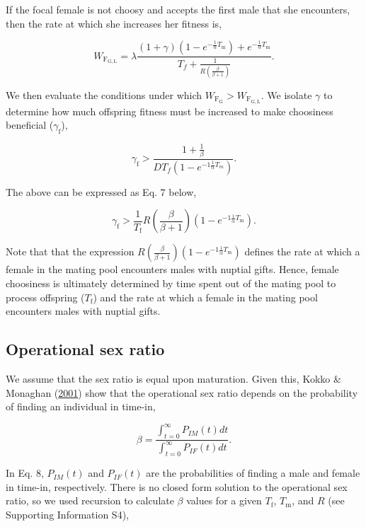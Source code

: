 \documentclass[
]{article}
\begin{document}
If the focal female is not choosy and accepts the first male that she
encounters, then the rate at which she increases her fitness is,

\[W_{\mathrm{F_{G,L}}} = \lambda \frac{\left(1 + \gamma\right)\left(1 - e^{-\frac{1}{\alpha}T_{\mathrm{m}}}\right) + e^{-\frac{1}{\alpha}T_{\mathrm{m}}}}{T_{f} + \frac{1}{R \left(\frac{\beta}{\beta + 1}\right)}}.\]

We then evaluate the conditions under which
\(W_{\mathrm{F_{G}}} > W_{\mathrm{F_{G,L}}}\). We isolate \(\gamma\) to
determine how much offspring fitness must be increased to make
choosiness beneficial (\(\gamma_{\mathrm{f}}\)),

\[\gamma_{\mathrm{f}} > \frac{1 + \frac{1}{\beta}}{D T_{f} \left(1 - e^{-1\frac{1}{\alpha}T_{m}}\right)}.\]

The above can be expressed as Eq. 7 below,

\begin{equation}
\gamma_{\mathrm{f}} > \frac{1}{T_{\mathrm{f}}} R\left(\frac{\beta}{\beta + 1}\right) \left(1 - e^{-1\frac{1}{\alpha}T_{\mathrm{m}}}\right).
\end{equation}

Note that that the expression
\(R\left(\frac{\beta}{\beta + 1}\right) \left(1 - e^{-1\frac{1}{\alpha}T_{\mathrm{m}}}\right)\)
defines the rate at which a female in the mating pool encounters males
with nuptial gifts. Hence, female choosiness is ultimately determined by
time spent out of the mating pool to process offspring
(\(T_{\mathrm{f}}\)) and the rate at which a female in the mating pool
encounters males with nuptial gifts.

\hypertarget{operational-sex-ratio}{%
\subsection{Operational sex ratio}\label{operational-sex-ratio}}

We assume that the sex ratio is equal upon maturation. Given this, Kokko
\& Monaghan (\protect\hyperlink{ref-Kokko2001}{2001}) show that the
operational sex ratio depends on the probability of finding an
individual in time-in,

\begin{equation}
\beta = \frac{\int_{t = 0}^{\infty} P_{IM}(t)dt}{\int_{t = 0}^{\infty} P_{IF}(t)dt}.
\end{equation}

In Eq. 8, \(P_{IM}(t)\) and \(P_{IF}(t)\) are the probabilities of
finding a male and female in time-in, respectively. There is no closed
form solution to the operational sex ratio, so we used recursion to
calculate \(\beta\) values for a given \(T_{\mathrm{f}}\),
\(T_{\mathrm{m}}\), and \(R\) (see Supporting Information S4),
\end{document}
